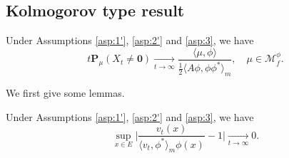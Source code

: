\subsection{Kolmogorov type result}
\begin{thm}\label{thm:Kolmogorov-type-of-theorem}
	Under Assumptions \ref{asp:1'}, \ref{asp:2'} and \ref{asp:3}, we have
\[
	t\mathbf P_\mu(X_t\neq \mathbf 0)
	\xrightarrow[t\to\infty]{} \frac{\langle \mu,\phi\rangle} {\frac{1}{2}\langle  A \phi,\phi \phi^*\rangle_m},
	\quad \mu\in \mathcal M^\phi_f.
\]
\end{thm}
	We first give some lemmas.
\begin{lem}\label{lem:Kolmogorov-1}
	Under Assumptions  \ref{asp:1'}, \ref{asp:2'} and \ref{asp:3}, we have
\[
	\sup_{x\in E}\Big | \frac{v_t(x)}{\langle v_t, \phi^*\rangle_m \phi(x)} - 1\Big |
	\xrightarrow[t\to\infty]{} 0.
\]
\end{lem}
